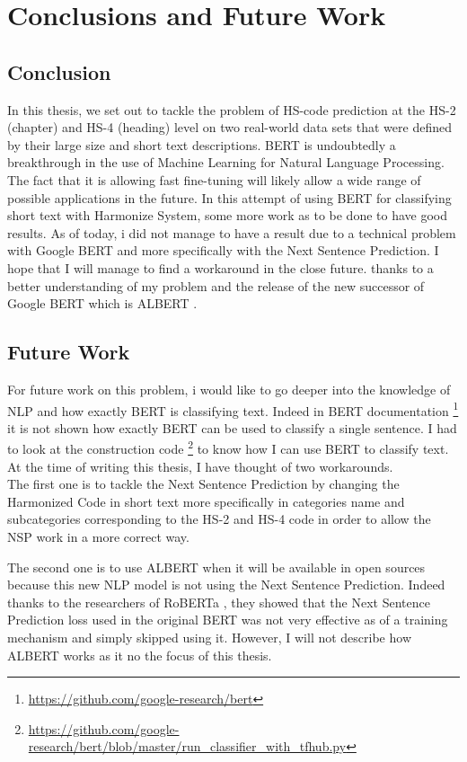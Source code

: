 \chapter{Conclusions and Future Work}\label{ch:concl}
\section{Conclusion}
In this thesis, we set out to tackle the problem of HS-code prediction at the HS-2 (chapter) and HS-4 (heading) level on two real-world data sets that were defined by their large size and short text descriptions. 
BERT is undoubtedly a breakthrough in the use of Machine Learning for Natural Language Processing. The fact that it is allowing fast fine-tuning will likely allow a wide range of possible applications in the future. In this attempt of using BERT for classifying short text with Harmonize System, some more work as to be done to have good results.
As of today, i did not manage to have a result due to a technical problem with Google BERT and more specifically with the Next Sentence Prediction. I hope that I will manage to find a workaround in the close future. thanks to a better understanding of my problem and the release of the new successor of Google BERT which is ALBERT \cite{Lan}.

\section{Future Work}
For future work on this problem, i would like to go deeper into the knowledge of NLP and how exactly BERT is classifying text. Indeed in BERT documentation \footnote{\url{https://github.com/google-research/bert}} it is not shown how exactly BERT can be used to classify a single sentence. I had to look at the construction code \footnote{\url{https://github.com/google-research/bert/blob/master/run_classifier_with_tfhub.py}} to know how I can use BERT to classify text. 
At the time of writing this thesis, I have thought of two workarounds. \\

The first one is to tackle the Next Sentence Prediction by changing the Harmonized Code in short text more specifically in categories name and subcategories corresponding to the HS-2 and HS-4 code in order to allow the NSP work in a more correct way.

The second one is to use ALBERT \cite{Lan} when it will be available in open sources because this new NLP model is not using the Next Sentence Prediction. Indeed thanks to the researchers of RoBERTa \cite{Liu2019b}, they showed that the Next Sentence Prediction loss used in the original BERT was not very effective as of a training mechanism and simply skipped using it. 
However, I will not describe how ALBERT\cite{Lan} works as it no the focus of this thesis.
